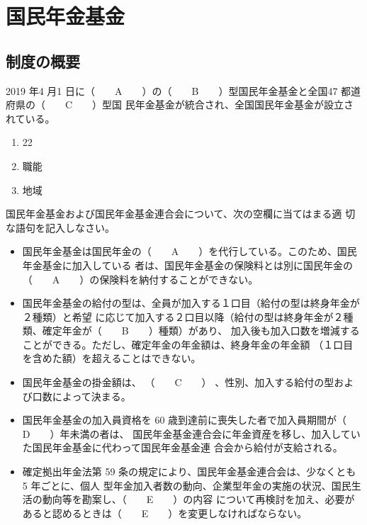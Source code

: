 \section{国民年金基金}

\subsection{制度の概要}

\begin{fillblank}[年金1 2019 問題1(4)\textcircled{1}]
  2019 年4 月1 日に（　　A　　）の（　　B　　）型国民年金基金と全国47 都道府県の（　　C　　）型国
民年金基金が統合され、全国国民年金基金が設立されている。
\end{fillblank}

\begin{answerbox}
  \begin{enumerate}[A:]
    \item 22
    \item 職能
    \item 地域
  \end{enumerate}
\end{answerbox}

\begin{fillblank}[年金1 H29 問題1(3)]
  国民年金基金および国民年金基金連合会について、次の空欄に当てはまる適
切な語句を記入しなさい。

\begin{itemize}
  \item 国民年金基金は国民年金の（　　A　　）を代行している。このため、国民年金基金に加入している
者は、国民年金基金の保険料とは別に国民年金の（　　A　　）の保険料を納付することができない。

  \item 国民年金基金の給付の型は、全員が加入する１口目（給付の型は終身年金が２種類）と希望
に応じて加入する２口目以降（給付の型は終身年金が２種類、確定年金が（　　B　　）種類）があり、
加入後も加入口数を増減することができる。ただし、確定年金の年金額は、終身年金の年金額
（１口目を含めた額）を超えることはできない。

  \item 国民年金基金の掛金額は、 （　　C　　） 、性別、加入する給付の型および口数によって決まる。
  
  \item 国民年金基金の加入員資格を 60 歳到達前に喪失した者で加入員期間が（　　D　　）年未満の者は、
国民年金基金連合会に年金資産を移し、加入していた国民年金基金に代わって国民年金基金連
合会から給付が支給される。

  \item 確定拠出年金法第 59 条の規定により、国民年金基金連合会は、少なくとも 5 年ごとに、個人
型年金加入者数の動向、企業型年金の実施の状況、国民生活の動向等を勘案し、（　　E　　）の内容
について再検討を加え、必要があると認めるときは（　　E　　）を変更しなければならない。
\end{itemize}

\end{fillblank}

